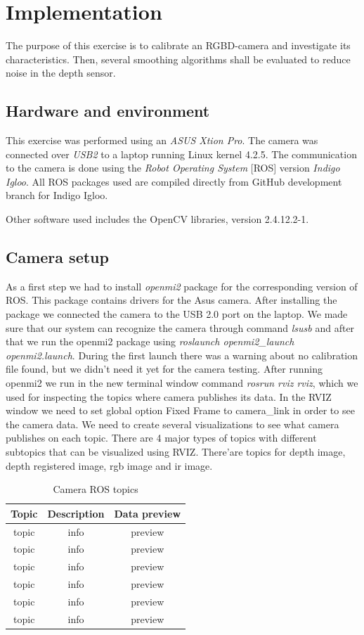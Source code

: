 \documentclass[11pt]{article}
\begin{document}
\section{Implementation}
The purpose of this exercise is to calibrate an RGBD-camera and investigate its characteristics. Then, several smoothing algorithms shall be evaluated to reduce noise in the depth sensor.
\subsection{Hardware and environment}
This exercise was performed using an \emph{ASUS Xtion Pro}. The camera was connected over \emph{USB2} to a laptop running Linux kernel 4.2.5. The communication to the camera is done using the \emph{Robot Operating System} [ROS] version \emph{Indigo Igloo}. All ROS packages used are compiled directly from GitHub development branch for Indigo Igloo. \par
Other software used includes the OpenCV libraries, version 2.4.12.2-1.
\subsection{Camera setup}
As a first step we had to install \emph{openmi2} package for the corresponding version of ROS. This package contains drivers for the Asus camera. After installing the package we connected the camera to the USB 2.0 port on the laptop. We made sure that our system can recognize the camera through command \emph{lsusb} and after that we run the openmi2 package using \emph{roslaunch openmi2_launch openmi2.launch}. During the first launch there was a warning about no calibration file found, but we didn't need it yet for the camera testing. After running openmi2 we run in the new terminal window command \emph{rosrun rviz rviz}, which we used for inspecting the topics where camera publishes its data. In the RVIZ window we need to set global option Fixed Frame to camera_link in order to see the camera data. We need to create several visualizations to see what camera publishes on each topic. There are 4 major types of topics with different subtopics that can be visualized using RVIZ. There'are topics for depth image, depth registered image, rgb image and ir image.  \par
\begin{table}[h!]
  \centering
  \caption{Camera ROS topics}
  \label{tab:table1}
  \begin{tabular}{ccc}
    \toprule
    Topic & Description & Data preview\\
    \midrule
    topic & info & preview\\
    topic & info & preview\\
    topic & info & preview\\
    topic & info & preview\\
    topic & info & preview\\
    topic & info & preview\\
    \bottomrule
  \end{tabular}
\end{table}
\end{document}
